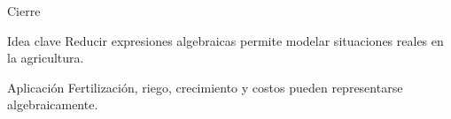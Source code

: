 \documentclass[handout,aspectratio=169,11pt]{beamer}
\begin{document}
	\begin{frame}{Cierre}
		\begin{block}{Idea clave}
			Reducir expresiones algebraicas permite modelar situaciones reales en la agricultura.
		\end{block}
		
		\pause
		
		\begin{block}{Aplicación}
			Fertilización, riego, crecimiento y costos pueden representarse algebraicamente.
		\end{block}
		
	\end{frame}
	
\end{document}
